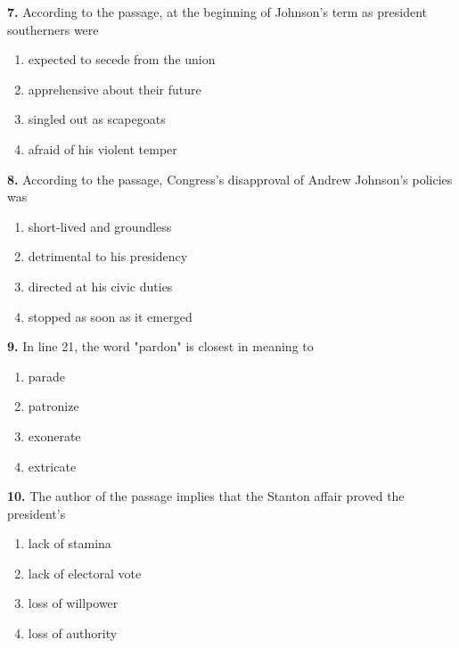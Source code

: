 \documentclass[12pt]{article}
\begin{document}
\vspace{0.25\baselineskip}
\noindent\textbf{7.} According to the passage, at the beginning of Johnson's term as president southerners were
\begin{enumerate}[label=(\Alph*),leftmargin=*,itemsep=0.2em]
\item expected to secede from the union
\item apprehensive about their future
\item singled out as scapegoats
\item afraid of his violent temper
\end{enumerate}
\par
\vspace{0.25\baselineskip}
\noindent\textbf{8.} According to the passage, Congress's disapproval of Andrew Johnson's policies was
\begin{enumerate}[label=(\Alph*),leftmargin=*,itemsep=0.2em]
\item short-lived and groundless
\item detrimental to his presidency
\item directed at his civic duties
\item stopped as soon as it emerged
\end{enumerate}
\par
\vspace{0.25\baselineskip}
\noindent\textbf{9.} In line 21, the word "pardon" is closest in meaning to
\begin{enumerate}[label=(\Alph*),leftmargin=*,itemsep=0.2em]
\item parade
\item patronize
\item exonerate
\item extricate
\end{enumerate}
\par
\vspace{0.25\baselineskip}
\noindent\textbf{10.} The author of the passage implies that the Stanton affair proved the president's
\begin{enumerate}[label=(\Alph*),leftmargin=*,itemsep=0.2em]
\item lack of stamina
\item lack of electoral vote
\item loss of willpower
\item loss of authority
\end{enumerate}
\par
\vspace{0.25\baselineskip}
\end{document}
